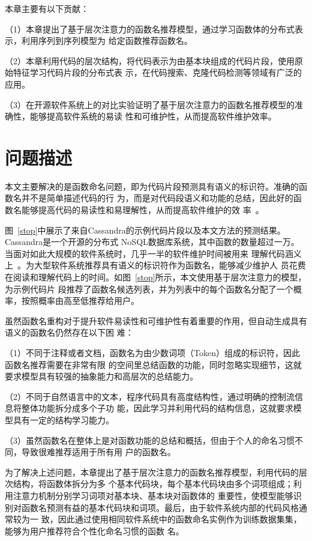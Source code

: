 本章主要有以下贡献：

（1）本章提出了基于层次注意力的函数名推荐模型，通过学习函数体的分布式表示，利用序列到序列模型为
给定函数推荐函数名。

（2）本章利用代码的层次结构，将代码表示为由基本块组成的代码片段，使用原始特征学习代码片段的分布式表
示，在代码搜索、克隆代码检测等领域有广泛的应用。

（3）在开源软件系统上的对比实验证明了基于层次注意力的函数名推荐模型的准确性，能够提高软件系统的易读
性和可维护性，从而提高软件维护效率。



\section{问题描述}\label{motivation3}
本文主要解决的是函数命名问题，即为代码片段预测具有语义的标识符。准确的函数名并不是简单描述代码的行
为，而是对代码段语义和功能的总结，因此好的函数名能够提高代码的易读性和易理解性，从而提高软件维护的效
率~\cite{takang1996effects}。

图~\ref{stop}中展示了来自Cassandra的示例代码片段以及本文方法的预测结果。Cassandra是一个开源的分布式
NoSQL数据库系统，其中函数的数量超过一万。当面对如此大规模的软件系统时，几乎一半的软件维护时间被用来
理解代码涵义上~\cite{corbi1989program}。为大型软件系统推荐具有语义的标识符作为函数名，能够减少维护人
员花费在阅读和理解代码上的时间。如图~\ref{stop}所示，本文使用基于层次注意力的模型，为示例代码片
段推荐了函数名候选列表，并为列表中的每个函数名分配了一个概率，按照概率由高至低推荐给用户。

虽然函数名重构对于提升软件易读性和可维护性有着重要的作用，但自动生成具有语义的函数名仍然存在以下困
难：

（1）不同于注释或者文档，函数名为由少数词项（Token）组成的标识符，因此函数名推荐需要在非常有限
的空间里总结函数的功能，同时忽略实现细节，这就要求模型具有较强的抽象能力和高层次的总结能力。

（2）不同于自然语言中的文本，程序代码具有高度结构性，通过明确的控制流信息将整体功能拆分成多个子功
能，因此学习并利用代码的结构信息，这就要求模型具有一定的结构学习能力。

（3）虽然函数名在整体上是对函数功能的总结和概括，但由于个人的命名习惯不同，导致很难推荐适用于所有用
户的函数名。

为了解决上述问题，本章提出了基于层次注意力的函数名推荐模型，利用代码的层次结构，将函数体拆分为多
个基本代码块，每个基本代码块由多个词项组成；利用注意力机制分别学习词项对基本块、基本块对函数体的
重要性，使模型能够识别对函数名预测有益的基本代码块和词项。最后，由于软件系统内部的代码风格通常较为一
致，因此通过使用相同软件系统中的函数命名实例作为训练数据集集，能够为用户推荐符合个性化命名习惯的函数
名。

